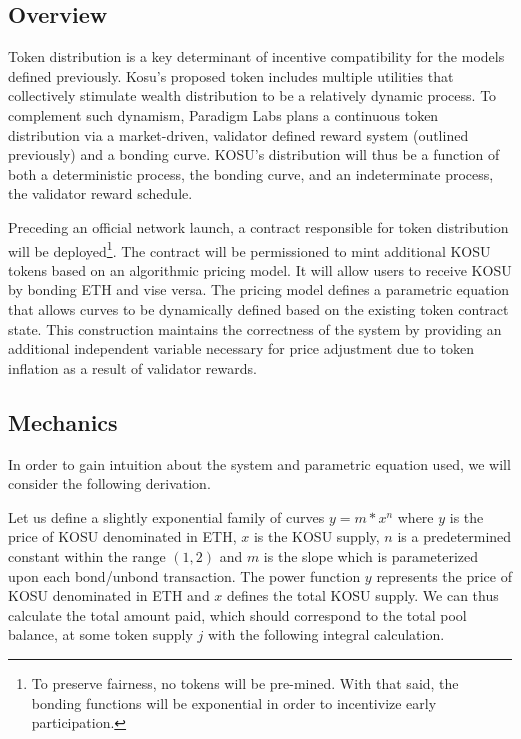 \documentclass[10pt]{article}
\begin{document}
\subsection{Overview}\label{token-distribution-overview}
Token distribution is a key determinant of incentive compatibility for the models defined previously. Kosu’s proposed token includes multiple utilities that collectively stimulate wealth distribution to be a relatively dynamic process. To complement such dynamism, Paradigm Labs plans a continuous token distribution via a market-driven, validator defined reward system (outlined previously) and a bonding curve. KOSU’s distribution will thus be a function of both a deterministic process, the bonding curve, and an indeterminate process, the validator reward schedule.
\medskip

Preceding an official network launch, a contract responsible for token distribution will be deployed\footnote{To preserve fairness, no tokens will be pre-mined. With that said, the bonding functions will be exponential in order to incentivize early participation.}. The contract will be permissioned to mint additional KOSU tokens based on an algorithmic pricing model. It will allow users to receive KOSU by bonding ETH and vise versa. The pricing model defines a parametric equation that allows curves to be dynamically defined based on the existing token contract state. This construction maintains the correctness of the system by providing an additional independent variable necessary for price adjustment due to token inflation as a result of validator rewards.

\subsection{Mechanics}\label{token-distribution-mechanics}
In order to gain intuition about the system and parametric equation used, we will consider the following derivation.
\medskip

Let us define a slightly exponential family of curves $ y = m*x^n $ where $y$ is the price of KOSU denominated in ETH, $x$ is the KOSU supply, $n$ is a predetermined constant within the range $(1,2)$ and $m$ is the slope which is parameterized upon each bond/unbond transaction. The power function $y$ represents the price of KOSU denominated in ETH and $x$ defines the total KOSU supply. We can thus calculate the total amount paid, which should correspond to the total pool balance, at some token supply $j$ with the following integral calculation.
\end{document}
